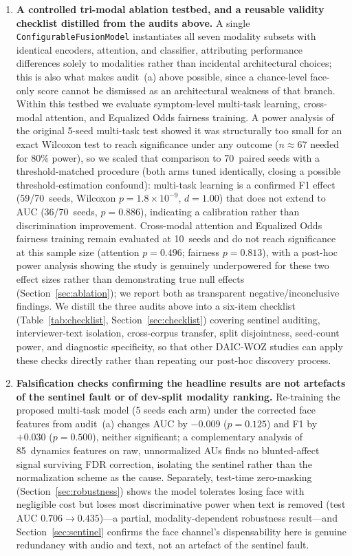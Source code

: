 \documentclass[journal]{IEEEtran}
\begin{document}
\begin{enumerate}
  \item \textbf{A controlled tri-modal ablation testbed, and a
  reusable validity checklist distilled from the audits above.} A
  single \texttt{ConfigurableFusionModel} instantiates all seven
  modality subsets with identical encoders, attention, and classifier,
  attributing performance differences solely to modalities rather than
  incidental architectural choices; this is also what makes audit~(a)
  above possible, since a chance-level face-only score cannot be
  dismissed as an architectural weakness of that branch. Within this
  testbed we evaluate symptom-level multi-task learning, cross-modal
  attention, and Equalized Odds fairness training. A power analysis of
  the original 5-seed multi-task test showed it was structurally too
  small for an exact Wilcoxon test to reach significance under any
  outcome ($n{\approx}67$ needed for 80\% power), so we scaled that
  comparison to 70~paired seeds with a threshold-matched procedure
  (both arms tuned identically, closing a possible
  threshold-estimation confound): multi-task learning is a confirmed
  F1 effect (59/70~seeds, Wilcoxon $p{=}1.8{\times}10^{-9}$, $d{=}1.00$)
  that does not extend to AUC (36/70~seeds, $p{=}0.886$), indicating a
  calibration rather than discrimination improvement.
  Cross-modal attention and Equalized Odds fairness training remain
  evaluated at 10~seeds and do not reach significance at this sample
  size (attention $p{=}0.496$; fairness $p{=}0.813$), with a post-hoc
  power analysis showing the study is genuinely underpowered for these
  two effect sizes rather than demonstrating true null effects
  (Section~\ref{sec:ablation}); we report both as transparent
  negative/inconclusive findings. We distill the three audits above
  into a six-item checklist (Table~\ref{tab:checklist},
  Section~\ref{sec:checklist}) covering sentinel auditing,
  interviewer-text isolation, cross-corpus transfer, split
  disjointness, seed-count power, and diagnostic specificity, so that
  other DAIC-WOZ studies can apply these checks directly rather than
  repeating our post-hoc discovery process.

  \item \textbf{Falsification checks confirming the headline results
  are not artefacts of the sentinel fault or of dev-split modality
  ranking.} Re-training the proposed multi-task model (5 seeds each
  arm) under the corrected face features from audit~(a) changes AUC by
  $-0.009$ ($p{=}0.125$) and F1 by $+0.030$ ($p{=}0.500$), neither
  significant; a complementary analysis of 85~dynamics features on
  raw, unnormalized AUs finds no blunted-affect signal surviving FDR
  correction, isolating the sentinel rather than the normalization
  scheme as the cause. Separately, test-time zero-masking
  (Section~\ref{sec:robustness}) shows the model tolerates losing face
  with negligible cost but loses most discriminative power when text
  is removed (test AUC $0.706\to0.435$)---a partial, modality-dependent
  robustness result---and Section~\ref{sec:sentinel} confirms the
  face channel's dispensability here is genuine redundancy with audio
  and text, not an artefact of the sentinel fault.


\end{enumerate}
\end{document}
